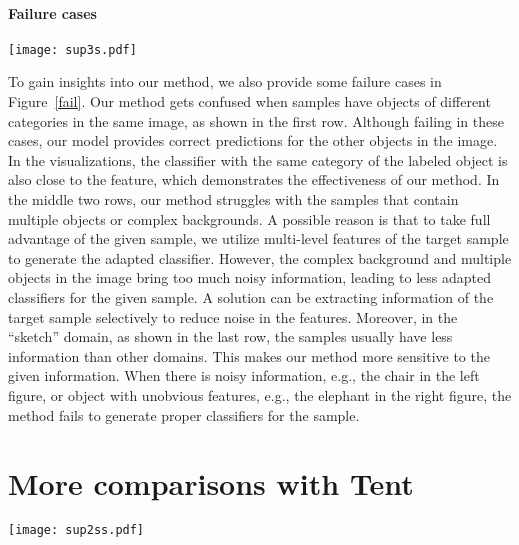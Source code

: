 \documentclass{article} \usepackage[table]{xcolor}
\begin{document}
\paragraph{Failure cases}
\begin{figure*}[t] 
\centering 
\centerline{\texttt{[image: sup3s.pdf]}} 
\caption{\textbf{Failure case  visualizations of our method.} The visualization settings are the same as Figure~\ref{supvisual}. Our method makes wrong predictions, be it that the correct classifiers are also close to the samples, which shows that the classifiers generated by our method are still adapted to the given sample in these cases.
} 
\label{fail}
\vspace{-6mm}
\end{figure*} 
To gain insights into our method, we also provide some failure cases in Figure~\ref{fail}. 
Our method gets confused when samples have objects of different categories in the same image, as shown in the first row.
Although failing in these cases, our model provides correct predictions for the other objects in the image. 
In the visualizations, the classifier with the same category of the labeled object is also close to the feature, which demonstrates the effectiveness of our method.
In the middle two rows, our method struggles with the samples that contain multiple objects or complex backgrounds.
A possible reason is that to take full advantage of the given sample, we utilize multi-level features of the target sample to generate the adapted classifier. 
However, the complex background and multiple objects in the image bring too much noisy information, leading to less adapted classifiers for the given sample.
A solution can be extracting information of the target sample selectively to reduce noise in the features.
Moreover, in the ``sketch'' domain, as shown in the last row, the samples usually have less information than other domains.
This makes our method more sensitive to the given information.
When there is noisy information, e.g., the chair in the left figure, or object with unobvious features, e.g., the elephant in the right figure, the method fails to generate proper classifiers for the sample.


\section{More comparisons with Tent}
\label{apptent}

\begin{figure*}[t] 
\centering 
\centerline{\texttt{[image: sup2ss.pdf]}} 
\vspace{-2mm}
\caption{\textbf{Single sample generalization vs. Tent for different settings on rotated-MNIST.}
Tent shows good performance with a large batch of samples from a single domain (left).
When provided only one sample or when given samples from different domains, without their domain id (right), Tent suffers.
In contrast, our method is independent to the number of target samples and domains. } 
\label{suptent}
\end{figure*} 
\end{document}
